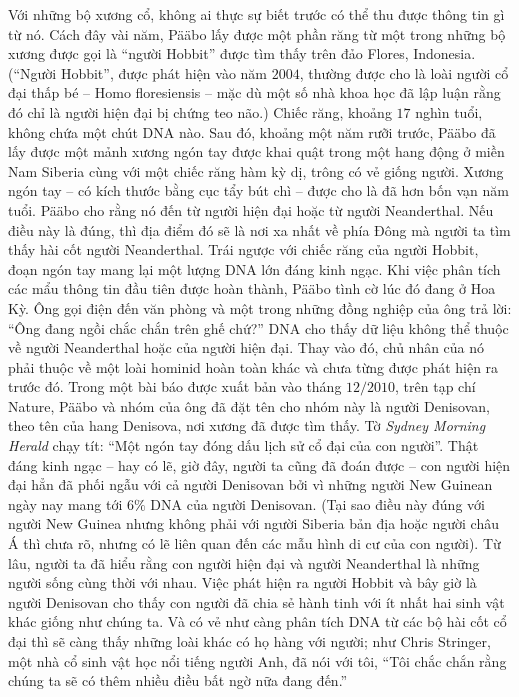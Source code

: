 \begin{multicols}{2}
	\vskip 0.1cm
	Với những bộ xương cổ, không ai thực sự biết trước có thể thu được thông tin gì từ nó. Cách đây vài năm, Pääbo lấy được một phần răng từ một trong những bộ xương được gọi là “người Hobbit” được tìm thấy trên đảo Flores, Indonesia. (“Người Hobbit”, được phát hiện vào năm $2004$, thường được cho là loài người cổ đại thấp bé -- Homo floresiensis -- mặc dù một số nhà khoa học đã lập luận rằng đó chỉ là người hiện đại bị chứng teo não.) Chiếc răng, khoảng $17$ nghìn tuổi, không chứa một chút DNA nào.
	\vskip 0.1cm
	Sau đó, khoảng một năm rưỡi trước, Pääbo đã lấy được một mảnh xương ngón tay được khai quật trong một hang động ở miền Nam Siberia cùng với một chiếc răng hàm kỳ dị, trông có vẻ giống người. Xương ngón tay -- có kích thước bằng cục tẩy bút chì -- được cho là đã hơn bốn vạn năm tuổi. Pääbo cho rằng nó đến từ người hiện đại hoặc từ người Neanderthal. Nếu điều này là đúng, thì địa điểm đó sẽ là nơi xa nhất về phía Đông mà người ta tìm thấy hài cốt người Neanderthal.
	\vskip 0.1cm
	Trái ngược với chiếc răng của người Hobbit, đoạn ngón tay mang lại một lượng DNA lớn đáng kinh ngạc. Khi việc phân tích các mẩu thông tin đầu tiên được hoàn thành, Pääbo tình cờ lúc đó đang ở Hoa Kỳ. Ông gọi điện đến văn phòng và một trong những đồng nghiệp của ông trả lời: “Ông đang ngồi chắc chắn trên ghế chứ?” DNA cho thấy dữ liệu không thể thuộc về người Neanderthal hoặc của người hiện đại. Thay vào đó, chủ nhân của nó phải thuộc về một loài hominid hoàn toàn khác và chưa từng được phát hiện ra trước đó. Trong một bài báo được xuất bản vào tháng $12/2010$, trên tạp chí Nature, Pääbo và nhóm của ông đã đặt tên cho nhóm này là người Denisovan, theo tên của hang Denisova, nơi xương đã được tìm thấy. Tờ \textit{Sydney Morning Herald} chạy tít: “Một ngón tay đóng dấu lịch sử cổ đại của con người”. Thật đáng kinh ngạc -- hay có lẽ, giờ đây, người ta cũng đã đoán được -- con người hiện đại hẳn đã phối ngẫu với cả người Denisovan bởi vì những người New Guinean ngày nay mang tới $6\%$ DNA của người Denisovan. (Tại sao điều này đúng với người New Guinea nhưng không phải với người Siberia bản địa hoặc người châu Á thì chưa rõ, nhưng có lẽ liên quan đến các mẫu hình di cư của con người).
	\vskip 0.1cm
	Từ lâu, người ta đã hiểu rằng con người hiện đại và người Neanderthal là những người sống cùng thời với nhau. Việc phát hiện ra người Hobbit và bây giờ là người Denisovan cho thấy con người đã chia sẻ hành tinh với ít nhất hai sinh vật khác giống như chúng ta. Và có vẻ như càng phân tích DNA từ các bộ hài cốt cổ đại thì sẽ càng thấy những loài khác có họ hàng với người; như Chris Stringer, một nhà cổ sinh vật học nổi tiếng người Anh, đã nói với tôi, “Tôi chắc chắn rằng chúng ta sẽ có thêm nhiều điều bất ngờ nữa đang đến.”

\end{multicols}
